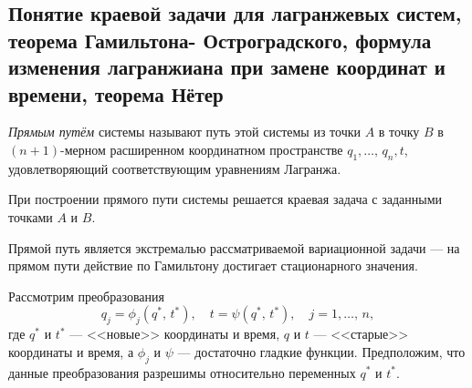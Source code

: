 \documentclass[a4paper]{article}
\begin{document}
\subsection{Понятие краевой задачи для лагранжевых систем, теорема Гамильтона-
Остроградского, формула изменения лагранжиана при замене координат и
времени, теорема Нётер}
\begin{dfn}
	\emph{Прямым путём} системы называют путь этой системы из точки $A$ в
	точку  $B$ в $(n+1)$-мерном расширенном координатном пространстве
	$q_1,\ldots,\,q_n,t$, удовлетворяющий соответствующим уравнениям
	Лагранжа.
\end{dfn}
При построении прямого пути системы решается краевая задача с заданными точками
$A$ и  $B$.
\begin{thm}
	Прямой путь является экстремалью рассматриваемой вариационной задачи
	--- на прямом пути действие по Гамильтону достигает стационарного
	значения.
\end{thm}
Рассмотрим преобразования
\[
	q_j=\phi_j(q^*,\,t^*),\quad t=\psi(q^*,\,t^*), \quad j=1,\ldots,\,n,
\] 
где $q^*$ и $t^*$ ---  <<новые>> координаты и время, $q$ и $t$ --- <<старые>>
координаты и время, а $\phi_j$ и $\psi$ --- достаточно гладкие функции.
Предположим, что данные преобразования разрешимы относительно переменных
$q^*$ и  $t^*$.
\end{document}
